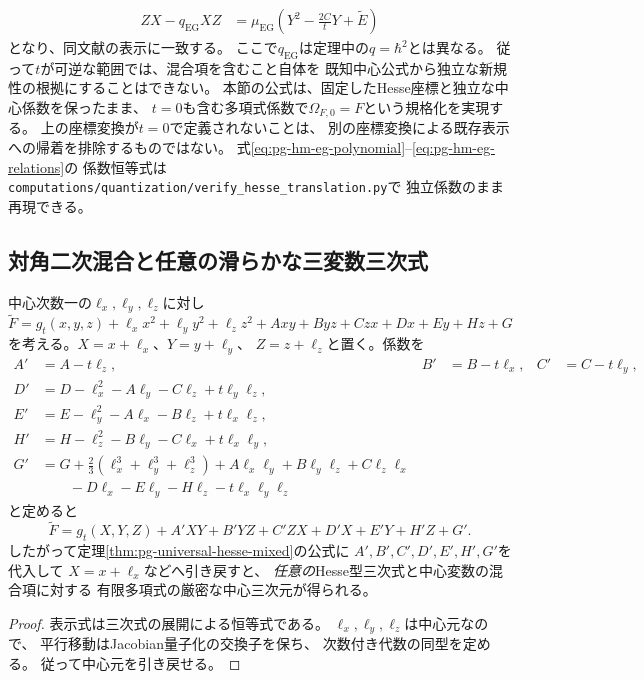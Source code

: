 \begin{remark}
\begin{equation}
\begin{aligned}
 ZX-q_{\mathrm{EG}}XZ
 &=\mu_{\mathrm{EG}}\left(Y^2-\frac{2C}{t}Y+\widetilde E\right)
 \end{aligned}
 \label{eq:pg-hm-eg-relations}
\end{equation}
となり、同文献の表示に一致する。
ここで$q_{\mathrm{EG}}$は定理中の$q=\hbar^2$とは異なる。
従って$t$が可逆な範囲では、混合項を含むこと自体を
既知中心公式から独立な新規性の根拠にすることはできない。
本節の公式は、固定したHesse座標と独立な中心係数を保ったまま、
$t=0$も含む多項式係数で$\Omega_{F,0}=F$という規格化を実現する。
上の座標変換が$t=0$で定義されないことは、
別の座標変換による既存表示への帰着を排除するものではない。
式\eqref{eq:pg-hm-eg-polynomial}--\eqref{eq:pg-hm-eg-relations}の
係数恒等式は\texttt{computations/quantization/verify\_hesse\_translation.py}で
独立係数のまま再現できる。
\end{remark}

\subsection{対角二次混合と任意の滑らかな三変数三次式}

\begin{corollary}[全ての中心混合項を含むHesse型]
\label{cor:pg-universal-hesse-all-mixed}
中心次数一の$\ell_x,\ell_y,\ell_z$に対し
\begin{equation}
 \widetilde F=g_t(x,y,z)
 +\ell_xx^2+\ell_yy^2+\ell_zz^2
 +Axy+Byz+Czx+Dx+Ey+Hz+G
\end{equation}
を考える。$X=x+\ell_x$、$Y=y+\ell_y$、
$Z=z+\ell_z$と置く。係数を
\begin{equation}
\begin{aligned}
 A'&=A-t\ell_z,& B'&=B-t\ell_x,& C'&=C-t\ell_y,\\
 D'&=D-\ell_x^2-A\ell_y-C\ell_z+t\ell_y\ell_z,\\
 E'&=E-\ell_y^2-A\ell_x-B\ell_z+t\ell_x\ell_z,\\
 H'&=H-\ell_z^2-B\ell_y-C\ell_x+t\ell_x\ell_y,\\
 G'&=G+\tfrac23(\ell_x^3+\ell_y^3+\ell_z^3)
 +A\ell_x\ell_y+B\ell_y\ell_z+C\ell_z\ell_x\\
 &\qquad-D\ell_x-E\ell_y-H\ell_z
 -t\ell_x\ell_y\ell_z
\end{aligned}
\label{eq:pg-hm-translation}
\end{equation}
と定めると
\begin{equation}
 \widetilde F
 =g_t(X,Y,Z)+A'XY+B'YZ+C'ZX+D'X+E'Y+H'Z+G'.
\end{equation}
したがって定理\ref{thm:pg-universal-hesse-mixed}の公式に
$A',B',C',D',E',H',G'$を代入して
$X=x+\ell_x$などへ引き戻すと、
\emph{任意の}Hesse型三次式と中心変数の混合項に対する
有限多項式の厳密な中心三次元が得られる。
\end{corollary}
\begin{proof}
表示式は三次式の展開による恒等式である。
$\ell_x,\ell_y,\ell_z$は中心元なので、
平行移動はJacobian量子化の交換子を保ち、
次数付き代数の同型を定める。
従って中心元を引き戻せる。
\end{proof}

